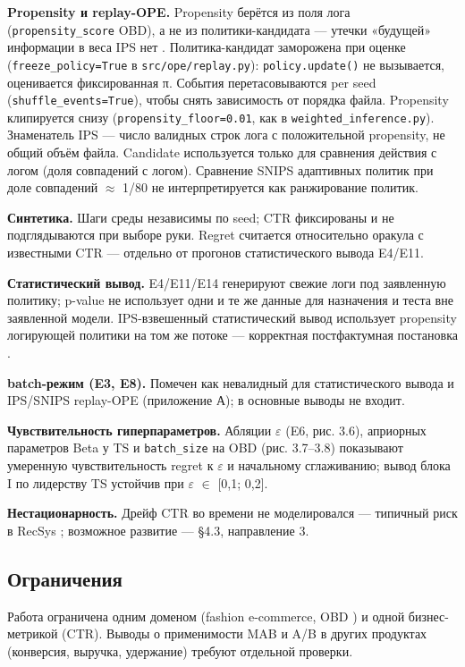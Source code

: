 \textbf{Propensity и replay-OPE.} Propensity берётся из поля лога (\texttt{propensity\_score} OBD), а не из политики-кандидата --- утечки «будущей» информации в веса IPS нет \cite{ref26}. Политика-кандидат заморожена при оценке (\texttt{freeze\_policy=True} в \texttt{src/ope/replay.py}): \texttt{policy.update()} не вызывается, оценивается фиксированная π. События перетасовываются per seed (\texttt{shuffle\_events=True}), чтобы снять зависимость от порядка файла. Propensity клипируется снизу (\texttt{propensity\_floor=0.01}, как в \texttt{weighted\_inference.py}). Знаменатель IPS --- число валидных строк лога с положительной propensity, не общий объём файла. Candidate используется только для сравнения действия с логом (доля совпадений с логом). Сравнение SNIPS адаптивных политик при доле совпадений $\approx$ 1/80 не интерпретируется как ранжирование политик.

\textbf{Синтетика.} Шаги среды независимы по seed; CTR фиксированы и не подглядываются при выборе руки. Regret считается относительно оракула с известными CTR --- отдельно от прогонов статистического вывода E4/E11.

\textbf{Статистический вывод.} E4/E11/E14 генерируют свежие логи под заявленную политику; p-value не использует одни и те же данные для назначения и теста вне заявленной модели. IPS-взвешенный статистический вывод использует propensity логирующей политики на том же потоке --- корректная постфактумная постановка \cite{ref30}.

\textbf{batch-режим (E3, E8).} Помечен как невалидный для статистического вывода и IPS/SNIPS replay-OPE (приложение А); в основные выводы не входит.

\textbf{Чувствительность гиперпараметров.} Абляции $\varepsilon$ (E6, рис. 3.6), априорных параметров Beta у TS и \texttt{batch\_size} на OBD (рис. 3.7--3.8) показывают умеренную чувствительность regret к $\varepsilon$ и начальному сглаживанию; вывод блока I по лидерству TS устойчив при $\varepsilon$ $\in$ [0,1; 0,2].

\textbf{Нестационарность.} Дрейф CTR во времени не моделировался --- типичный риск в RecSys \cite{ref16,ref38}; возможное развитие --- §4.3, направление 3.

\subsection{Ограничения}\label{ux43eux433ux440ux430ux43dux438ux447ux435ux43dux438ux44f}

Работа ограничена одним доменом (fashion e-commerce, OBD \cite{ref26}) и одной бизнес-метрикой (CTR). Выводы о применимости MAB и A/B в других продуктах (конверсия, выручка, удержание) требуют отдельной проверки.


